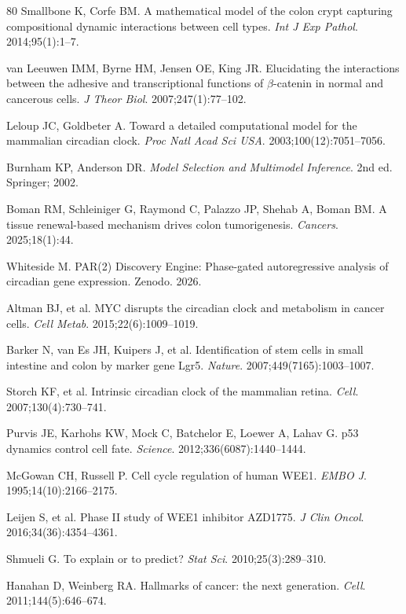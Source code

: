 \documentclass[11pt,a4paper]{article}
\begin{document}
\begin{thebibliography}{80}
Smallbone K, Corfe BM. A mathematical model of the colon crypt capturing compositional dynamic interactions between cell types. \textit{Int J Exp Pathol}. 2014;95(1):1--7.

van Leeuwen IMM, Byrne HM, Jensen OE, King JR. Elucidating the interactions between the adhesive and transcriptional functions of $\beta$-catenin in normal and cancerous cells. \textit{J Theor Biol}. 2007;247(1):77--102.

Leloup JC, Goldbeter A. Toward a detailed computational model for the mammalian circadian clock. \textit{Proc Natl Acad Sci USA}. 2003;100(12):7051--7056.

Burnham KP, Anderson DR. \textit{Model Selection and Multimodel Inference}. 2nd ed. Springer; 2002.

Boman RM, Schleiniger G, Raymond C, Palazzo JP, Shehab A, Boman BM. A tissue renewal-based mechanism drives colon tumorigenesis. \textit{Cancers}. 2025;18(1):44.

Whiteside M. PAR(2) Discovery Engine: Phase-gated autoregressive analysis of circadian gene expression. Zenodo. 2026.

Altman BJ, et al. MYC disrupts the circadian clock and metabolism in cancer cells. \textit{Cell Metab}. 2015;22(6):1009--1019.

Barker N, van Es JH, Kuipers J, et al. Identification of stem cells in small intestine and colon by marker gene Lgr5. \textit{Nature}. 2007;449(7165):1003--1007.

Storch KF, et al. Intrinsic circadian clock of the mammalian retina. \textit{Cell}. 2007;130(4):730--741.

Purvis JE, Karhohs KW, Mock C, Batchelor E, Loewer A, Lahav G. p53 dynamics control cell fate. \textit{Science}. 2012;336(6087):1440--1444.

McGowan CH, Russell P. Cell cycle regulation of human WEE1. \textit{EMBO J}. 1995;14(10):2166--2175.

Leijen S, et al. Phase II study of WEE1 inhibitor AZD1775. \textit{J Clin Oncol}. 2016;34(36):4354--4361.

Shmueli G. To explain or to predict? \textit{Stat Sci}. 2010;25(3):289--310.

Hanahan D, Weinberg RA. Hallmarks of cancer: the next generation. \textit{Cell}. 2011;144(5):646--674.


\end{thebibliography}
\end{document}
